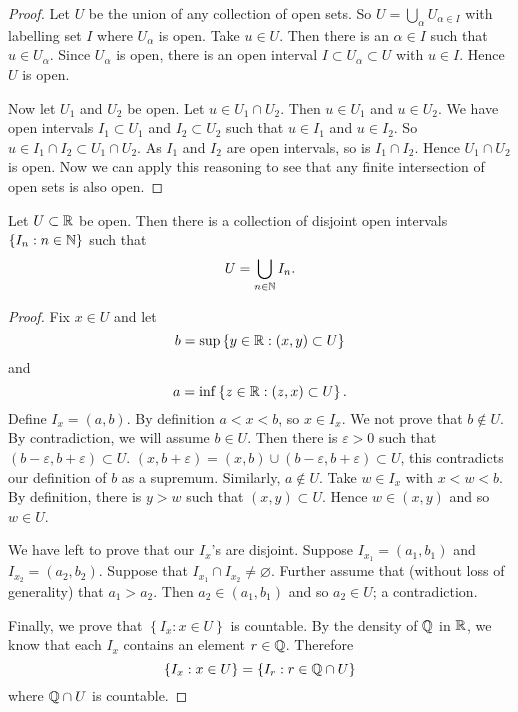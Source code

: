 \begin{proof}
	Let $U$ be the union of any collection of open sets.
	So $U = \bigcup_\alpha U_{\alpha\in I}$ with labelling set $I$ 
	where $U_\alpha$ is open.
	Take $u \in U$.
	Then there is an $\alpha \in I$ such that $u \in U_\alpha$.
	Since $U_\alpha$ is open, there is an open interval
	$I \subset U_\alpha \subset U$ with $u \in I$.
	Hence $U$ is open.
	
	Now let $U_1$ and $U_2$ be open.
	Let $u \in U_1 \cap U_2$.
	Then $u \in U_1$ and $u \in U_2$.
	We have open intervals $I_1 \subset U_1$ and $I_2 \subset U_2$
	such that $u \in I_1$ and $u \in I_2$.
	So $u \in I_1 \cap I_2 \subset U_1 \cap U_2$.
	As $I_1$ and $I_2$ are open intervals, so is $I_1 \cap I_2$.
	Hence $U_1 \cap U_2$ is open.
	Now we can apply this reasoning to see that any finite intersection of
	open sets is also open.
\end{proof}

\begin{theorem}[]
	Let $U \subset \mathbb{R}$ be open.
	Then there is a collection of disjoint open intervals
	$\left\{ I_n : n \in \mathbb{N} \right\}$
	such that \[
		U = \bigcup_{n \in \mathbb{N}} I_n.
	\]
\end{theorem}

\begin{proof}
	Fix $x \in U$
	and let 
	\[
		b = \sup \left\{ y \in \mathbb{R} : (x,y) \subset U \right\}
	\]
	and 
	\[
		a = \inf \left\{ z \in \mathbb{R} : (z,x) \subset U \right\}.
	\]
	Define $I_x = (a,b)$.
	By definition $a < x < b$, so $x \in I_x$.
	We not prove that $b \not\in U$.
	By contradiction, we will assume $b \in U$.
	Then there is $\varepsilon > 0$ such that 
	$(b - \varepsilon, b + \varepsilon) \subset U$.
	$(x, b + \varepsilon) 
	= (x, b) \cup (b - \varepsilon, b + \varepsilon) \subset U$,
	this contradicts our definition of $b$ as a supremum.
	Similarly, $a \not \in U$.
	Take $w \in I_x$ with $x < w < b$.
	By definition, there is $y > w$ such that $(x,y) \subset U$.
	Hence $w \in (x,y)$ and so $w \in U$.

	We have left to prove that our $I_x$'s are disjoint.
	Suppose $I_{x_1} = (a_1, b_1)$ and $I_{x_2} = (a_2, b_2)$.
	Suppose that $I_{x_1} \cap I_{x_2} \neq \varnothing$.
	Further assume that (without loss of generality) that $a_1 > a_2$.
	Then $a_2 \in (a_1, b_1)$ and so $a_2 \in U$; a contradiction.

	Finally, we prove that $\left\{ I_x : x \in U \right\}$ is countable.
	By the density of $\mathbb{Q}$ in $\mathbb{R}$, 
	we know that each $I_x$ contains an element $r \in \mathbb{Q}$.
	Therefore
	\[
		\left\{ I_x : x \in U \right\}
		= \left\{ I_r  : r \in \mathbb{Q} \cap U \right\}
	\]
	where $\mathbb{Q} \cap U$ is countable.
\end{proof}

